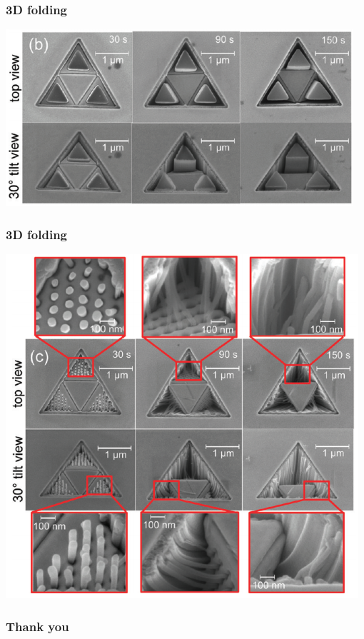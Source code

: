 \documentclass{beamer}
\begin{document}
\begin{frame}\frametitle{3D folding}
    \centering
    \begin{minipage}{0.7\textwidth}
		\includegraphics[width=\textwidth]{images/fig8.png}
	\end{minipage}
\end{frame}
\begin{frame}\frametitle{3D folding}
    \centering
    \begin{minipage}{0.5\textwidth}
		\includegraphics[width=\textwidth]{images/fig7.png}
	\end{minipage}
\end{frame}


\begin{frame}\frametitle{Thank you}
\end{frame}
\end{document}
